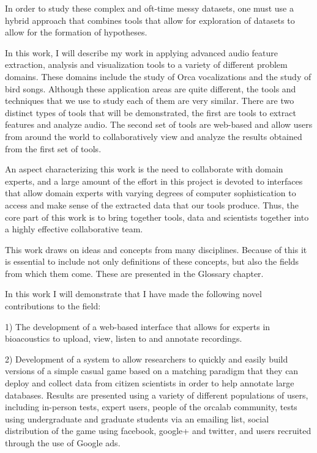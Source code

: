 \documentclass[12pt,oneside]{book}
\begin{document}
In order to study these complex and oft-time messy datasets, one must
use a hybrid approach that combines tools that allow for exploration
of datasets to allow for the formation of hypotheses.  

In this work, I will describe my work in applying advanced audio
feature extraction, analysis and visualization tools to a variety of
different problem domains.  These domains include the study of Orca
vocalizations and the study of bird songs.  Although these application
areas are quite different, the tools and techniques that we use to
study each of them are very similar.  There are two distinct types of
tools that will be demonstrated, the first are tools to extract
features and analyze audio.  The second set of tools are web-based and
allow users from around the world to collaboratively view and analyze
the results obtained from the first set of tools.

An aspect characterizing this work is the need to collaborate with
domain experts, and a large amount of the effort in this project is
devoted to interfaces that allow domain experts with varying degrees
of computer sophistication to access and make sense of the extracted
data that our tools produce.  Thus, the core part of this work is to
bring together tools, data and scientists together into a highly
effective collaborative team.

This work draws on ideas and concepts from many disciplines.  Because
of this it is essential to include not only definitions of these
concepts, but also the fields from which them come.  These are
presented in the Glossary chapter.

In this work I will demonstrate that I have made the following novel
contributions to the field:

1) The development of a web-based interface that allows for experts in
bioacoustics to upload, view, listen to and annotate recordings.

2) Development of a system to allow researchers to quickly and easily
build versions of a simple casual game based on a matching paradigm
that they can deploy and collect data from citizen scientists in order
to help annotate large databases.  Results are presented using a
variety of different populations of users, including in-person tests,
expert users, people of the orcalab community, tests using
undergraduate and graduate students via an emailing list, social
distribution of the game using facebook, google+ and twitter, and
users recruited through the use of Google ads.
\end{document}
